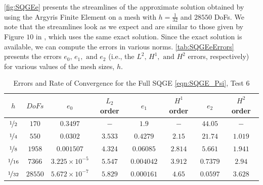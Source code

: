 \autoref{fig:SQGEe} presents the streamlines of the approximate solution obtained by using the
Argyris Finite Element on a mesh with $h=\frac{1}{32}$ and $28550$ DoFs. We note that the
streamlines look as we expect and are similar to those given by Figure $10$ in \cite{Myers}, which
uses the same exact solution. Since the exact solution is available, we can compute the errors in
various norms. \autoref{tab:SQGEeErrors} presents the errors $e_0,\, e_1, \text{ and } e_2$ (i.e.,
the $L^2,\, H^1, \text{ and } H^2$ errors, respectively) for various values of the mesh sizes, $h$.

\begin{table}%
\begin{center}
\begin{tabular}{|c|c|c|c|c|c|c|c|}%
  \hline
  $h$ & $DoFs$ & $e_0$ & $L_2$ order & $e_1$ & $H^1$ order & $e_2$ & $H^2$ order \\[0.2em] %
  \hline
  $\nicefrac{1}{2}$ & $170$ & $0.3497$ & $-$ & $1.9$ & $-$ & $44.05$ & $-$ \\[0.2em] %
  $\nicefrac{1}{4}$ & $550$ & $0.0302$ & $3.533$ & $0.4279$ & $2.15$ & $21.74$ & $1.019$ \\[0.2em] %
  $\nicefrac{1}{8}$ & $1958$ & $0.001507$ & $4.324$ & $0.06085$ & $2.814$ & $5.661$ & $1.941$ \\[0.2em] %
  $\nicefrac{1}{16}$ & $7366$ & $3.225\times 10^{-5}$ & $5.547$ & $0.004042$ & $3.912$ & $0.7379$ & $2.94$ \\[0.2em] %
  $\nicefrac{1}{32}$ & $28550$ & $5.672\times 10^{-7}$ & $5.829$ & $0.000161$ & $4.65$ & $0.0597$ & $3.628$ \\[0.2em] %
 \hline
\end{tabular}
\end{center}
\caption{Errors and Rate of Convergence for the Full SQGE \eqref{eqn:SQGE_Psi}, Test 6}
\label{tab:SQGEeErrors}
\end{table}

